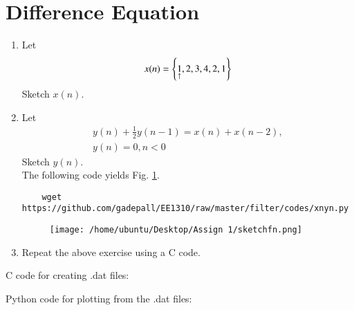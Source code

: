 \documentclass[journal,12pt,twocolumn]{IEEEtran}
\renewcommand\thesection{\arabic{section}}
\begin{document}
\section{Difference Equation}
\begin{enumerate}[label=\thesection.\arabic*,ref=\thesection.\theenumi]
\item Let
\label{def:xn}
\begin{equation}
	x(n) = \left\{\underset{\uparrow}{1},2,3,4,2,1\right\}
\end{equation}
Sketch $x(n)$.
\item Let
\begin{multline}
	\label{eq:iir_filter}
	y(n) + \frac{1}{2}y(n-1) = x(n) + x(n-2), 
	\\
	y(n) = 0, n < 0
\end{multline}
Sketch $y(n)$.  
\\
\solution The following code yields Fig. \ref{fig:xnyn}.
\begin{lstlisting}
	wget https://github.com/gadepall/EE1310/raw/master/filter/codes/xnyn.py
\end{lstlisting}
\begin{figure}[!ht]
	\begin{center}
		\texttt{[image: /home/ubuntu/Desktop/Assign 1/sketchfn.png]}
	\end{center}
	\label{fig:xnyn}	
\end{figure}
\item Repeat the above exercise using a C code.
\end{enumerate}
\solution
C code for creating .dat files:

Python code for plotting from the .dat files:

\end{document}
